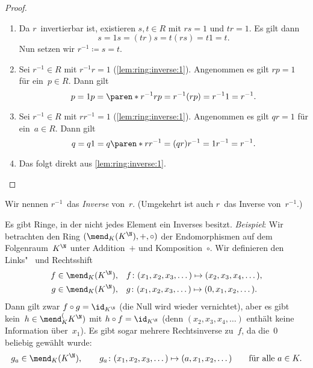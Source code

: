 \documentclass[a4paper]{article}
\begin{document}
\begin{proof}
    \begin{enumerate}
        \item Da $r$~invertierbar ist, existieren $s,t \in R$ mit $rs = 1$ und $tr = 1$. Es gilt dann
              \begin{equation*}
                  s = 1s = (tr)s = t(rs) = t1 = t.
              \end{equation*}
              Nun setzen wir $r^{-1} \coloneqq s = t$.
        \item Sei $r^{-1} \in R$ mit $r^{-1}r = 1$ (\cref{lem:ring:inverse:1}). Angenommen es gilt $rp = 1$ für ein~$p \in R$. Dann gilt
              \begin{equation*}
                  p = 1p = \paren*{r^{-1}r}p = r^{-1}(rp) = r^{-1}1 = r^{-1}.
              \end{equation*}
        \item Sei $r^{-1} \in R$ mit $rr^{-1} = 1$ (\cref{lem:ring:inverse:1}). Angenommen es gilt $qr = 1$ für ein~$a \in R$. Dann gilt
              \begin{equation*}
                  q = q1 = q\paren*{rr^{-1}} = (qr)r^{-1} = 1r^{-1} = r^{-1}.
              \end{equation*}
        \item Das folgt direkt aus \cref{lem:ring:inverse:1}.\qedhere
    \end{enumerate}
\end{proof}

\begin{notation}[Inverse]
    Wir nennen $r^{-1}$~das \emph{Inverse} von~$r$. (Umgekehrt ist auch $r$~das Inverse von~$r^{-1}$.)
\end{notation}

\begin{remark}\label{rem:inverseproblems}
    Es gibt Ringe, in der nicht jedes Element ein Inverses besitzt. \emph{Beispiel}: Wir betrachten den Ring $(\mend_K(K^\N),+,\circ)$ der Endomorphismen auf dem Folgenraum~$K^\N$ unter Addition~$+$ und Komposition~$\circ$. Wir definieren den Links"~ und Rechtsshift
    \begin{align*}
        f \in \mend_K(K^\N),\quad & f\colon (x_1,x_2,x_3,\dots) \mapsto (x_2,x_3,x_4,\dots), \\
        g \in \mend_K(K^\N),\quad & g\colon (x_1,x_2,x_3,\dots) \mapsto (0,x_1,x_2,\dots).
    \end{align*}
    Dann gilt zwar $f\circ g = \id_{K^\N}$ (die Null wird wieder vernichtet), aber es gibt kein~$h \in \mend_K^(K^\N)$ mit $h\circ f = \id_{K^\N}$ (denn $(x_2,x_3,x_4,\dots)$ enthält keine Information über~$x_1$). Es gibt sogar mehrere Rechtsinverse zu~$f$, da die~$0$ beliebig gewählt wurde:
    \begin{equation*}
        g_a \in \mend_K(K^\N),\qquad g_a\colon (x_1,x_2,x_3,\dots) \mapsto (a,x_1,x_2,\dots) \qquad\text{für alle } a \in K.
    \end{equation*}
\end{remark}
\end{document}
